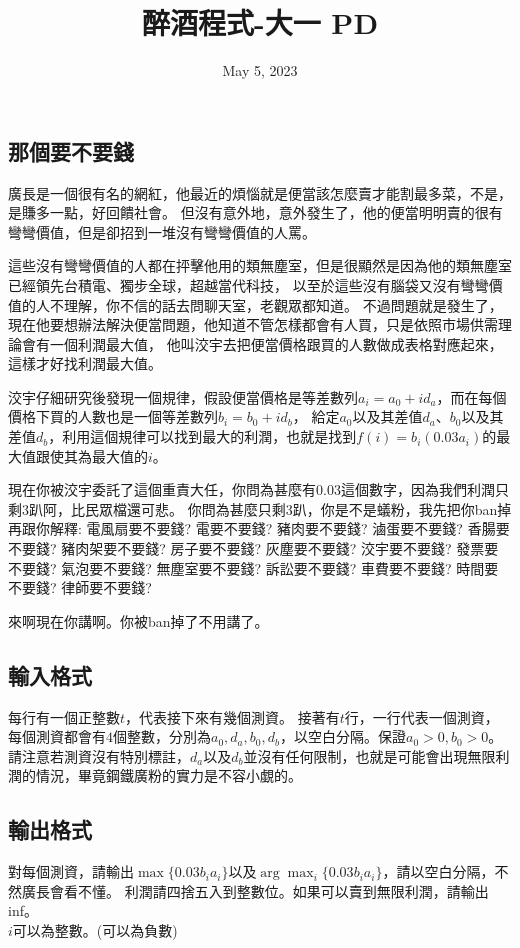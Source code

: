 \documentclass{article}
\title{醉酒程式-大一 PD}
\date{May 5, 2023}
\begin{document}
\begin{CJK*}{UTF8}{bsmi}

\maketitle

\section*{那個要不要錢}
廣長是一個很有名的網紅，他最近的煩惱就是便當該怎麼賣才能割最多菜，不是，是賺多一點，好回饋社會。
但沒有意外地，意外發生了，他的便當明明賣的很有彎彎價值，但是卻招到一堆沒有彎彎價值的人罵。

這些沒有彎彎價值的人都在抨擊他用的類無塵室，但是很顯然是因為他的類無塵室已經領先台積電、獨步全球，超越當代科技，
以至於這些沒有腦袋又沒有彎彎價值的人不理解，你不信的話去問聊天室，老觀眾都知道。
不過問題就是發生了，現在他要想辦法解決便當問題，他知道不管怎樣都會有人買，只是依照市場供需理論會有一個利潤最大值，
他叫洨宇去把便當價格跟買的人數做成表格對應起來，這樣才好找利潤最大值。

洨宇仔細研究後發現一個規律，假設便當價格是等差數列$a_i=a_0+id_a$，而在每個價格下買的人數也是一個等差數列$b_i=b_0+id_b$，
給定$a_0$以及其差值$d_a$、$b_0$以及其差值$d_b$，利用這個規律可以找到最大的利潤，也就是找到$f(i)=b_i(0.03a_i)$的最大值跟使其為最大值的$i$。

現在你被洨宇委託了這個重責大任，你問為甚麼有$0.03$這個數字，因為我們利潤只剩$3$趴阿，比民眾檔還可悲。
你問為甚麼只剩$3$趴，你是不是蟻粉，我先把你ban掉再跟你解釋:
電風扇要不要錢? 電要不要錢? 豬肉要不要錢? 滷蛋要不要錢? 香腸要不要錢? 豬肉架要不要錢? 房子要不要錢? 灰塵要不要錢? 
洨宇要不要錢? 發票要不要錢? 氣泡要不要錢? 無塵室要不要錢? 訴訟要不要錢? 車費要不要錢? 時間要不要錢? 律師要不要錢?

來啊現在你講啊。你被ban掉了不用講了。

\subsection*{輸入格式}
每行有一個正整數$t$，代表接下來有幾個測資。
接著有$t$行，一行代表一個測資，每個測資都會有$4$個整數，分別為$a_0,d_a,b_0,d_b$，以空白分隔。保證$a_0>0,b_0>0$。
請注意若測資沒有特別標註，$d_a$以及$d_b$並沒有任何限制，也就是可能會出現無限利潤的情況，畢竟鋼鐵廣粉的實力是不容小覷的。

\subsection*{輸出格式}
對每個測資，請輸出$\max\{0.03b_ia_i\}$以及$\arg\max_i\{0.03b_ia_i\}$，請以空白分隔，不然廣長會看不懂。
利潤請四捨五入到整數位。如果可以賣到無限利潤，請輸出inf。\\
$i$可以為整數。(可以為負數)


\end{CJK*}
\end{document}
